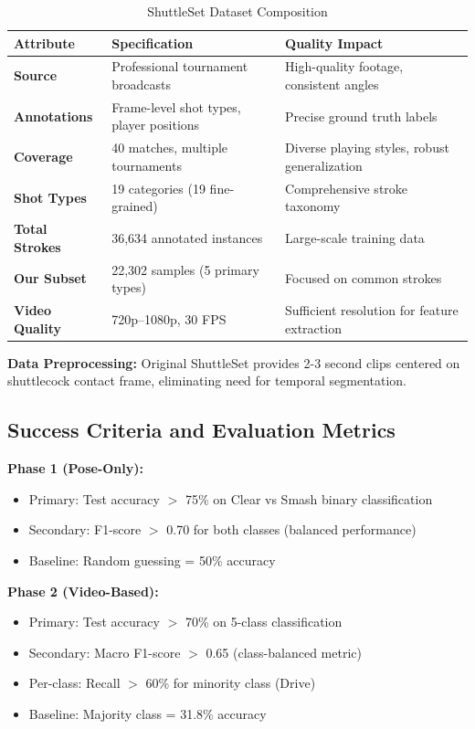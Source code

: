 \documentclass[11pt,a4paper]{article}
\begin{document}
\begin{table}[H]
\centering
\caption{ShuttleSet Dataset Composition}
\begin{tabular}{lll}
\toprule
Attribute & Specification & Quality Impact \\
\midrule
\textbf{Source} & Professional tournament broadcasts & High-quality footage, consistent angles \\
\textbf{Annotations} & Frame-level shot types, player positions & Precise ground truth labels \\
\textbf{Coverage} & 40 matches, multiple tournaments & Diverse playing styles, robust generalization \\
\textbf{Shot Types} & 19 categories (19 fine-grained) & Comprehensive stroke taxonomy \\
\textbf{Total Strokes} & 36,634 annotated instances & Large-scale training data \\
\textbf{Our Subset} & 22,302 samples (5 primary types) & Focused on common strokes \\
\textbf{Video Quality} & 720p--1080p, 30 FPS & Sufficient resolution for feature extraction \\
\bottomrule
\end{tabular}
\end{table}

\textbf{Data Preprocessing:} Original ShuttleSet provides 2-3 second clips centered on shuttlecock contact frame, eliminating need for temporal segmentation.

\subsection{Success Criteria and Evaluation Metrics}

\textbf{Phase 1 (Pose-Only):}
\begin{itemize}
\item Primary: Test accuracy $>$ 75\% on Clear vs Smash binary classification
\item Secondary: F1-score $>$ 0.70 for both classes (balanced performance)
\item Baseline: Random guessing = 50\% accuracy
\end{itemize}

\textbf{Phase 2 (Video-Based):}
\begin{itemize}
\item Primary: Test accuracy $>$ 70\% on 5-class classification
\item Secondary: Macro F1-score $>$ 0.65 (class-balanced metric)
\item Per-class: Recall $>$ 60\% for minority class (Drive)
\item Baseline: Majority class = 31.8\% accuracy
\end{itemize}
\end{document}
